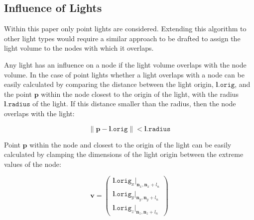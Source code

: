 

\subsection{Influence of Lights}



Within this paper only point lights are considered. Extending this algorithm to other
light types would require a similar approach to be drafted to assign the light volume
to the nodes with which it overlaps.

Any light has an influence on a node if the light volume overlaps with the node volume.
In the case of point lights whether a light overlaps with a node can be easily calculated
by comparing the distance between the light origin, $\mathbf{l}\mathtt{.orig}$, and the
point $\mathbf{p}$ within the node closest to the origin of the light, with the radius
$\mathbf{l}\mathtt{.radius}$ of the light. If this distance smaller than the radius,
then the node overlaps with the light:

\begin{equation*}
  \left\lVert \mathbf{p} - \mathbf{l}\mathtt{.orig} \right\rVert < \mathbf{l}\mathtt{.radius}
\end{equation*}

\noindent Point $\mathbf{p}$ within the node and closest to the origin of the light can be
easily calculated by clamping the dimensions of the light origin between the extreme values
of the node:

\begin{equation*}
   \mathbf{v} = \begin{pmatrix} \mathbf{l}.\mathtt{orig}_x \vert_{\mathbf{n}_{x}, \mathbf{n}_{x} + \mathit{l_n}} \\
                                \mathbf{l}.\mathtt{orig}_y \vert_{\mathbf{n}_{y}, \mathbf{n}_{y} + \mathit{l_n}} \\
                                \mathbf{l}.\mathtt{orig}_z \vert_{\mathbf{n}_{z}, \mathbf{n}_{z} + \mathit{l_n}} 
                \end{pmatrix} 
\end{equation*}

